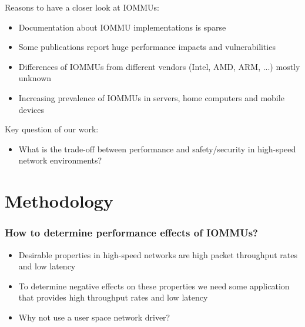 \begin{frame}
    Reasons to have a closer look at IOMMUs:

    \begin{itemize}
        \item Documentation about IOMMU implementations is sparse
        \item Some publications report huge performance impacts and
            vulnerabilities
        \item Differences of IOMMUs from different vendors (Intel, AMD, ARM, ...)
            mostly unknown
        \item Increasing prevalence of IOMMUs in servers, home computers and
            mobile devices
    \end{itemize}

    \vspace{1em}

    Key question of our work:
    
    \begin{itemize}
        \item What is the trade-off between performance and safety/security in
            high-speed network environments?
    \end{itemize}
\end{frame}


\section{Methodology}

\begin{frame}
    \frametitle{How to determine performance effects of IOMMUs?}

    \begin{itemize}
        \item Desirable properties in high-speed networks are high packet
            throughput rates and low latency
        \item To determine negative effects on these properties we need some
            application that provides high throughput rates and low latency
        \item Why not use a user space network driver?
    \end{itemize}
\end{frame}

